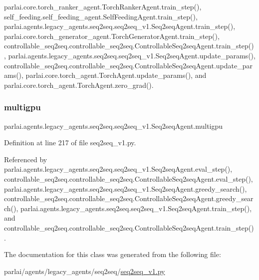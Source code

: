 parlai.\+core.\+torch\+\_\+ranker\+\_\+agent.\+Torch\+Ranker\+Agent.\+train\+\_\+step(), self\+\_\+feeding.\+self\+\_\+feeding\+\_\+agent.\+Self\+Feeding\+Agent.\+train\+\_\+step(), parlai.\+agents.\+legacy\+\_\+agents.\+seq2seq.\+seq2seq\+\_\+v1.\+Seq2seq\+Agent.\+train\+\_\+step(), parlai.\+core.\+torch\+\_\+generator\+\_\+agent.\+Torch\+Generator\+Agent.\+train\+\_\+step(), controllable\+\_\+seq2seq.\+controllable\+\_\+seq2seq.\+Controllable\+Seq2seq\+Agent.\+train\+\_\+step(), parlai.\+agents.\+legacy\+\_\+agents.\+seq2seq.\+seq2seq\+\_\+v1.\+Seq2seq\+Agent.\+update\+\_\+params(), controllable\+\_\+seq2seq.\+controllable\+\_\+seq2seq.\+Controllable\+Seq2seq\+Agent.\+update\+\_\+params(), parlai.\+core.\+torch\+\_\+agent.\+Torch\+Agent.\+update\+\_\+params(), and parlai.\+core.\+torch\+\_\+agent.\+Torch\+Agent.\+zero\+\_\+grad().

\mbox{\label{classparlai_1_1agents_1_1legacy__agents_1_1seq2seq_1_1seq2seq__v1_1_1Seq2seqAgent_a82ff9540ce457658a7a7035055b36f77}} 
\subsubsection{\texorpdfstring{multigpu}{multigpu}}
{\footnotesize\ttfamily parlai.\+agents.\+legacy\+\_\+agents.\+seq2seq.\+seq2seq\+\_\+v1.\+Seq2seq\+Agent.\+multigpu}



Definition at line 217 of file seq2seq\+\_\+v1.\+py.



Referenced by parlai.\+agents.\+legacy\+\_\+agents.\+seq2seq.\+seq2seq\+\_\+v1.\+Seq2seq\+Agent.\+eval\+\_\+step(), controllable\+\_\+seq2seq.\+controllable\+\_\+seq2seq.\+Controllable\+Seq2seq\+Agent.\+eval\+\_\+step(), parlai.\+agents.\+legacy\+\_\+agents.\+seq2seq.\+seq2seq\+\_\+v1.\+Seq2seq\+Agent.\+greedy\+\_\+search(), controllable\+\_\+seq2seq.\+controllable\+\_\+seq2seq.\+Controllable\+Seq2seq\+Agent.\+greedy\+\_\+search(), parlai.\+agents.\+legacy\+\_\+agents.\+seq2seq.\+seq2seq\+\_\+v1.\+Seq2seq\+Agent.\+train\+\_\+step(), and controllable\+\_\+seq2seq.\+controllable\+\_\+seq2seq.\+Controllable\+Seq2seq\+Agent.\+train\+\_\+step().



The documentation for this class was generated from the following file\+:\begin{DoxyCompactItemize}
\item 
parlai/agents/legacy\+\_\+agents/seq2seq/\hyperlink{seq2seq__v1_8py}{seq2seq\+\_\+v1.\+py}\end{DoxyCompactItemize}

